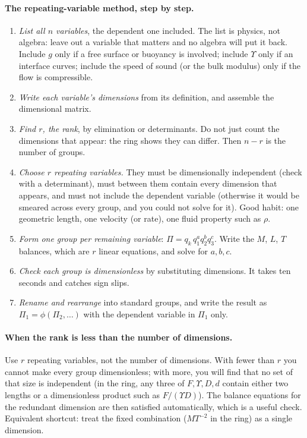 \paragraph{The repeating-variable method, step by step.}
\begin{enumerate}[leftmargin=*]
\item \emph{List all $n$ variables}, the dependent one included. The list is physics, not algebra: leave out a variable that matters and no algebra will put it back. Include $g$ only if a free surface or buoyancy is involved; include $\Upsilon$ only if an interface curves; include the speed of sound (or the bulk modulus) only if the flow is compressible.
\item \emph{Write each variable's dimensions} from its definition, and assemble the dimensional matrix.
\item \emph{Find $r$, the rank}, by elimination or determinants. Do not just count the dimensions that appear: the ring shows they can differ. Then $n - r$ is the number of groups.
\item \emph{Choose $r$ repeating variables.} They must be dimensionally independent (check with a determinant), must between them contain every dimension that appears, and must not include the dependent variable (otherwise it would be smeared across every group, and you could not solve for it). Good habit: one geometric length, one velocity (or rate), one fluid property such as $\rho$.
\item \emph{Form one group per remaining variable}: $\Pi = q_k \, q_1^{a} q_2^{b} q_3^{c}$. Write the $M$, $L$, $T$ balances, which are $r$ linear equations, and solve for $a, b, c$.
\item \emph{Check each group is dimensionless} by substituting dimensions. It takes ten seconds and catches sign slips.
\item \emph{Rename and rearrange} into standard groups, and write the result as $\Pi_1 = \phi(\Pi_2, \dots)$ with the dependent variable in $\Pi_1$ only.
\end{enumerate}

\paragraph{When the rank is less than the number of dimensions.} Use $r$ repeating variables, not the number of dimensions. With fewer than $r$ you cannot make every group dimensionless; with more, you will find that no set of that size is independent (in the ring, any three of $F, \Upsilon, D, d$ contain either two lengths or a dimensionless product such as $F/(\Upsilon D)$). The balance equations for the redundant dimension are then satisfied automatically, which is a useful check. Equivalent shortcut: treat the fixed combination ($MT^{-2}$ in the ring) as a single dimension.

